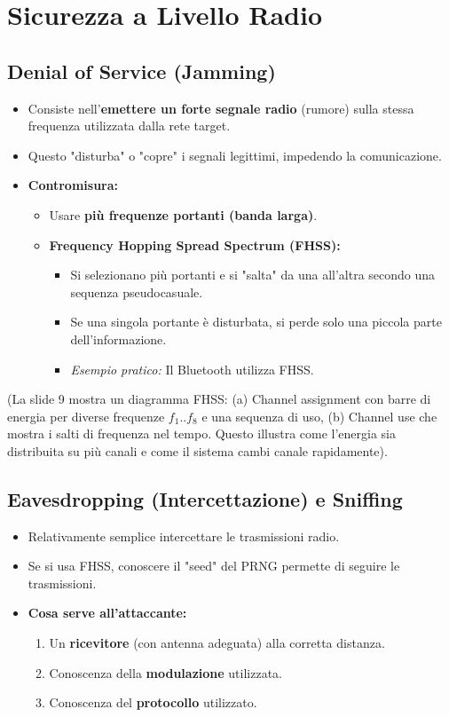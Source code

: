 \documentclass{article}
\begin{document}
\section{Sicurezza a Livello Radio}
\subsection{Denial of Service (Jamming)}
\begin{itemize}
    \item Consiste nell'\textbf{emettere un forte segnale radio} (rumore) sulla stessa frequenza utilizzata dalla rete target.
    \item Questo "disturba" o "copre" i segnali legittimi, impedendo la comunicazione.
    \item \textbf{Contromisura:}
    \begin{itemize}
        \item Usare \textbf{più frequenze portanti (banda larga)}.
        \item \textbf{Frequency Hopping Spread Spectrum (FHSS):}
        \begin{itemize}
            \item Si selezionano più portanti e si "salta" da una all'altra secondo una sequenza pseudocasuale.
            \item Se una singola portante è disturbata, si perde solo una piccola parte dell'informazione.
            \item \textit{Esempio pratico:} Il Bluetooth utilizza FHSS.
        \end{itemize}
    \end{itemize}
\end{itemize}
(La slide 9 mostra un diagramma FHSS: (a) Channel assignment con barre di energia per diverse frequenze $f_1..f_8$ e una sequenza di uso, (b) Channel use che mostra i salti di frequenza nel tempo. Questo illustra come l'energia sia distribuita su più canali e come il sistema cambi canale rapidamente).

\subsection{Eavesdropping (Intercettazione) e Sniffing}
\begin{itemize}
    \item Relativamente semplice intercettare le trasmissioni radio.
    \item Se si usa FHSS, conoscere il "seed" del PRNG permette di seguire le trasmissioni.
    \item \textbf{Cosa serve all'attaccante:}
    \begin{enumerate}
        \item Un \textbf{ricevitore} (con antenna adeguata) alla corretta distanza.
        \item Conoscenza della \textbf{modulazione} utilizzata.
        \item Conoscenza del \textbf{protocollo} utilizzato.
    \end{enumerate}
\end{itemize}
\end{document}
